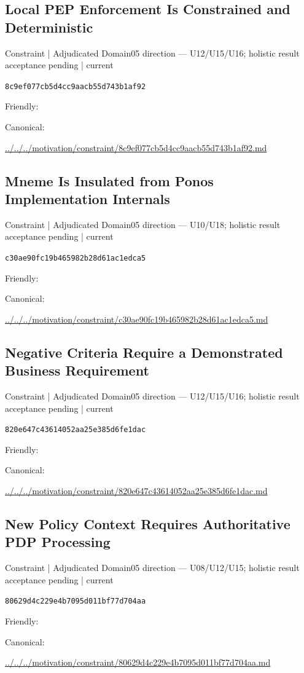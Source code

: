 \documentclass[10pt,a4paper]{article}
\begin{document}
\subsection*{Local PEP Enforcement Is Constrained and Deterministic}
{\small Constraint | Adjudicated Domain05 direction — U12/U15/U16; holistic result acceptance pending | current}\par
\texttt{8c9ef077cb5d4cc9aacb55d743b1af92}\par
Friendly: \par
Canonical: \par
{\footnotesize\url{../../../motivation/constraint/8c9ef077cb5d4cc9aacb55d743b1af92.md}}\par
\subsection*{Mneme Is Insulated from Ponos Implementation Internals}
{\small Constraint | Adjudicated Domain05 direction — U10/U18; holistic result acceptance pending | current}\par
\texttt{c30ae90fc19b465982b28d61ac1edca5}\par
Friendly: \par
Canonical: \par
{\footnotesize\url{../../../motivation/constraint/c30ae90fc19b465982b28d61ac1edca5.md}}\par
\subsection*{Negative Criteria Require a Demonstrated Business Requirement}
{\small Constraint | Adjudicated Domain05 direction — U12/U15/U16; holistic result acceptance pending | current}\par
\texttt{820e647c43614052aa25e385d6fe1dac}\par
Friendly: \par
Canonical: \par
{\footnotesize\url{../../../motivation/constraint/820e647c43614052aa25e385d6fe1dac.md}}\par
\subsection*{New Policy Context Requires Authoritative PDP Processing}
{\small Constraint | Adjudicated Domain05 direction — U08/U12/U15; holistic result acceptance pending | current}\par
\texttt{80629d4c229e4b7095d011bf77d704aa}\par
Friendly: \par
Canonical: \par
{\footnotesize\url{../../../motivation/constraint/80629d4c229e4b7095d011bf77d704aa.md}}\par
\end{document}
